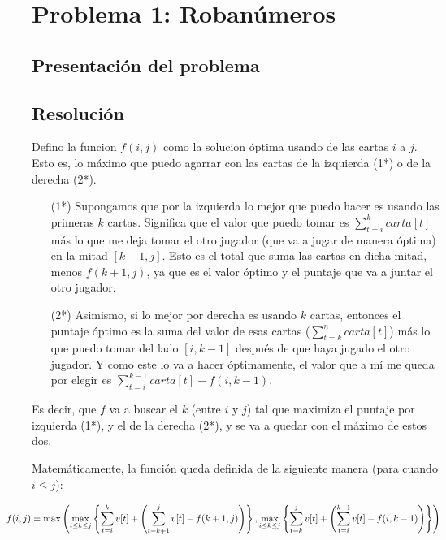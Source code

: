 \section{Problema 1: Roban\'umeros}

\subsection{Presentaci\'on del problema}

\subsection{Resoluci\'on}

Defino la funcion $f(i,j)$ como la solucion \'optima usando de las cartas $i$ a $j$. Esto es, lo m\'aximo que puedo agarrar con las cartas de la izquierda (1*) o de la derecha (2*). 

\begin{enumerate}
\item[(1*)] \label{x_izq} Supongamos que por la izquierda lo mejor que puedo hacer es usando las primeras $k$ cartas. Significa que el valor que puedo tomar es $\sum_{t=i}^{k} carta[t]$ m\'as lo que me deja tomar el otro jugador (que va a jugar de manera \'optima) en la mitad $[k+1, j]$. Esto es el total que suma las cartas en dicha mitad, menos $f(k+1, j)$, ya que es el valor \'optimo y el puntaje que va a juntar el otro jugador. 

\item[(2*)] \label{x_der} Asimismo, si lo mejor por derecha es usando $k$ cartas, entonces el puntaje \'optimo es la suma del valor de esas cartas ($\sum_{t=k}^{n} carta[t]$) m\'as lo que puedo tomar del lado $[i, k-1]$ despu\'es de que haya jugado el otro jugador. Y como este lo va a hacer \'optimamente, el valor que a m\'i me queda por elegir es $\sum_{t=i}^{k-1} carta[t] - f(i,k-1)$. 
\end{enumerate}

Es decir, que $f$ va a buscar el $k$ (entre $i$ y $j$) tal que maximiza el puntaje por izquierda (1*), y el de la derecha (2*), y se va a quedar con el m\'aximo de estos dos.

Matem\'aticamente, la funci\'on queda definida de la siguiente manera (para cuando $i \leq j$): 

$$\hspace*{-1cm} f(i,j) = \max\left( 
      \max_{i \leq k \leq j}\left\{ \sum_{t=i}^k v[t] + \left( \sum_{t=k+1}^{j} v[t] - f(k+1,j) \right) \right\},  
      \max_{i \leq k \leq j}\left\{ \sum_{t=k}^j v[t] + \left( \sum_{t=i}^{k-1} v[t] - f(i,k-1) \right) \right\} 
    \right) $$

